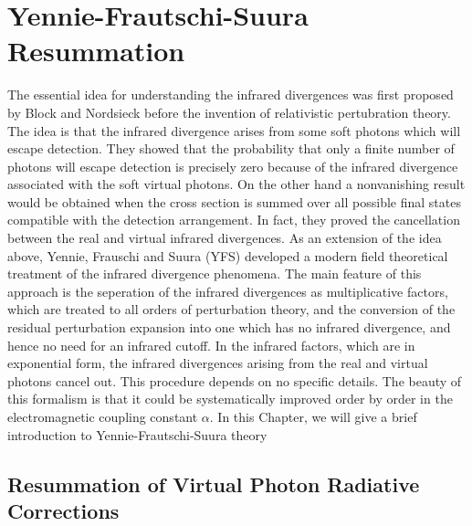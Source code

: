 \chapter{Yennie-Frautschi-Suura Resummation} 

The essential idea for understanding the infrared divergences was first proposed by Block and Nordsieck \cite{Block} before the invention of relativistic pertubration theory. The idea is that the infrared divergence arises from some soft photons which will escape detection. They showed that the probability that only a finite number of photons will escape detection is precisely zero because of the infrared divergence associated with the soft virtual photons. On the other hand a nonvanishing result would be obtained when the cross section is summed over all possible final states compatible with the detection arrangement. In fact, they proved the cancellation between the real and virtual infrared divergences. As an extension of the idea above, Yennie, Frauschi and Suura (YFS) \cite{YFS} developed a modern field theoretical treatment of the infrared divergence phenomena. The main feature of this approach is the seperation of the infrared divergences as multiplicative factors, which are treated to all orders of perturbation theory, and the conversion of the residual perturbation expansion into one which has no infrared divergence, and hence no need for an infrared cutoff. In the infrared factors, which are in exponential form, the infrared divergences arising from the real and virtual photons cancel out. This procedure depends on no specific details. The beauty of this formalism is that it could be systematically improved order by order in the electromagnetic coupling constant $\alpha$. In this Chapter, we will give a brief introduction to Yennie-Frautschi-Suura theory\cite{YFS,BFLW1987,BFLWQFT}

\section{Resummation of Virtual Photon Radiative Corrections}

